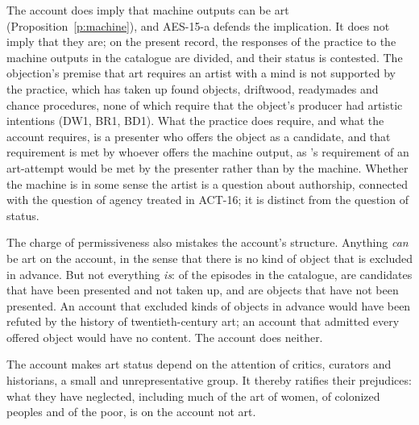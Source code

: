 \documentclass{situationist-preprint}
\begin{document}
\begin{reply}
The account does imply that machine outputs can be art (Proposition~\ref{p:machine}), and AES-15-a defends the implication. It does not imply that they are; on the present record, the responses of the practice to the machine outputs in the catalogue are divided, and their status is contested. The objection's premise that art requires an artist with a mind is not supported by the practice, which has taken up found objects, driftwood, readymades and chance procedures, none of which require that the object's producer had artistic intentions (DW1, BR1, BD1). What the practice does require, and what the account requires, is a presenter who offers the object as a candidate, and that requirement is met by whoever offers the machine output, as \citet{MagUidhir2013}'s requirement of an art-attempt would be met by the presenter rather than by the machine. Whether the machine is in some sense the artist is a question about authorship, connected with the question of agency treated in ACT-16; it is distinct from the question of status.

The charge of permissiveness also mistakes the account's structure. Anything \emph{can} be art on the account, in the sense that there is no kind of object that is excluded in advance. But not everything \emph{is}: of the \stnepisodes{} episodes in the catalogue, \stvK{} are candidates that have been presented and not taken up, and \stvN{} are objects that have not been presented. An account that excluded kinds of objects in advance would have been refuted by the history of twentieth-century art; an account that admitted every offered object would have no content. The account does neither.
\end{reply}

\begin{objection}[Elitism]\label{o:elite}
The account makes art status depend on the attention of critics, curators and historians, a small and unrepresentative group. It thereby ratifies their prejudices: what they have neglected, including much of the art of women, of colonized peoples and of the poor, is on the account not art.
\end{objection}
\end{document}
